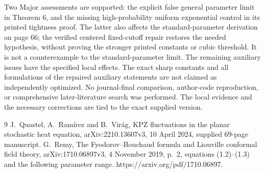 \documentclass[10pt]{article}
\begin{document}
Two Major assessments are supported: the explicit false general parameter limit in Theorem 6, and the missing high-probability uniform exponential control in its printed tightness proof. The latter also affects the standard-parameter derivation on page 66; the verified centered fixed-cutoff repair restores the needed hypothesis, without proving the stronger printed constants or cubic threshold. It is not a counterexample to the standard-parameter limit. The remaining auxiliary issues have the specified local effects. The exact sharp constants and all formulations of the repaired auxiliary statements are not claimed as independently optimized. No journal-final comparison, author-code reproduction, or comprehensive later-literature search was performed. The local evidence and the necessary corrections are tied to the exact supplied version.\par
9 J. Quastel, A. Ramírez and B. Virág, KPZ fluctuations in the planar stochastic heat equation, arXiv:2210.13607v3, 10 April 2024, supplied 69-page manuscript. G. Remy, The Fyodorov–Bouchaud formula and Liouville conformal field theory, arXiv:1710.06897v3, 4 November 2019, p. 2, equations (1.2)–(1.3) and the following parameter range. https://arxiv.org/pdf/1710.06897.\par
\end{document}
